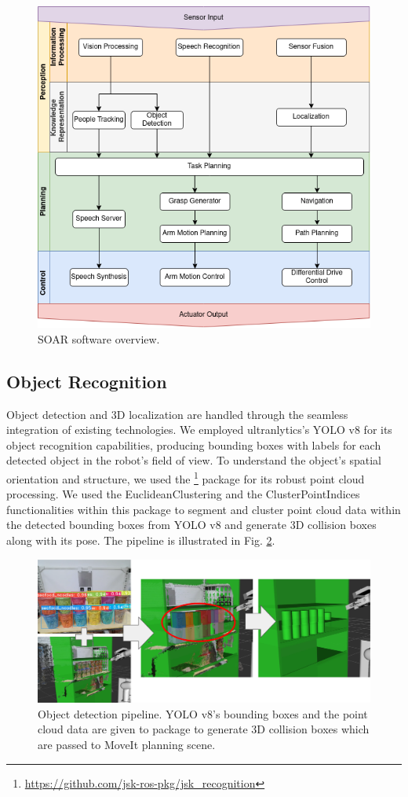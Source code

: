 \documentclass[runningheads,a4paper]{llncs}
\begin{document}
\begin{figure}[tbp]
	\centering
	\includegraphics[width=0.7\linewidth]{images/software_overview.png}
	\caption{SOAR software overview.}
	\label{fig:overview}
\end{figure}

\subsection{Object Recognition}
Object detection and 3D localization are handled through the seamless integration of existing technologies.
We employed ultranlytics’s YOLO v8\cite{yolov8_ultralytics} for its object recognition capabilities, producing bounding boxes with labels for each detected object in the robot’s field of view.
To understand the object’s spatial orientation and structure, we used the \footnote{\url{https://github.com/jsk-ros-pkg/jsk\_recognition}} package for its robust point cloud processing.
We used the EuclideanClustering and the ClusterPointIndices functionalities within this package to segment and cluster point cloud data within the detected bounding boxes from YOLO v8 and generate 3D collision boxes along with its pose.
The pipeline is illustrated in Fig. \ref{fig:object_detection_pipeline}.
\begin{figure}[tbp]
	\centering
	\includegraphics[width=1.0\linewidth]{images/object_detection_pipeline.png}
	\caption{Object detection pipeline.
		YOLO v8's bounding boxes and the point cloud data are given to  package to generate 3D collision boxes which are passed to MoveIt planning scene.}
	\label{fig:object_detection_pipeline}
\end{figure}
\end{document}
